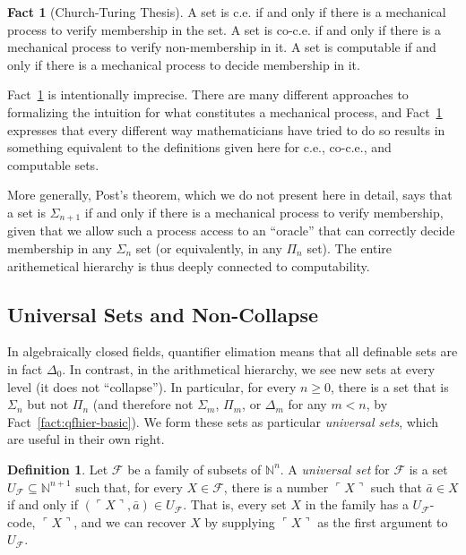 \documentclass{article}
\theoremstyle{plain}
\theoremstyle{definition}
\newtheorem{defn}[thm]{Definition}
\newtheorem{fact}[thm]{Fact}
\newcommand{\defterm}{\emph}
\newcommand{\tuple}{\bar}
\newcommand{\lgnum}{\ulcorner}
\newcommand{\rgnum}{\urcorner}
\begin{document}
\begin{fact}[Church-Turing Thesis]\label{fact:ct-thesis}
  A set is c.e. if and only if there is a mechanical process to verify
  membership in the set. A set is co-c.e. if and only if there is a
  mechanical process to verify non-membership in it. A set is
  computable if and only if there is a mechanical process to decide
  membership in it.
\end{fact}

Fact~\ref{fact:ct-thesis} is intentionally imprecise. There are many
different approaches to formalizing the intuition for what constitutes
a mechanical process, and Fact~\ref{fact:ct-thesis} expresses that
every different way mathematicians have tried to do so results in
something equivalent to the definitions given here for c.e., co-c.e.,
and computable sets.

More generally, Post's theorem, which we do not present here in
detail, says that a set is $\Sigma_{n+1}$ if and only if there is a
mechanical process to verify membership, given that we allow such a
process access to an ``oracle'' that can correctly decide membership
in any $\Sigma_n$ set (or equivalently, in any $\Pi_n$ set). The
entire arithemetical hierarchy is thus deeply connected to
computability.

\subsection{Universal Sets and Non-Collapse}

In algebraically closed fields, quantifier elimation means that all
definable sets are in fact $\Delta_0$. In contrast, in the
arithmetical hierarchy, we see new sets at every level (it does not
``collapse''). In particular, for every $n \geq 0$, there is a set
that is $\Sigma_n$ but not $\Pi_n$ (and therefore not $\Sigma_m$,
$\Pi_m$, or $\Delta_m$ for any $m < n$, by
Fact~\ref{fact:qfhier-basic}). We form these sets as particular
\defterm{universal sets}, which are useful in their own right.

\begin{defn}
  Let $\mathcal{F}$ be a family of subsets of $\mathbb{N}^n$. A
  \defterm{universal set} for $\mathcal{F}$ is a set $U_\mathcal{F}
  \subseteq \mathbb{N}^{n+1}$ such that, for every $X \in
  \mathcal{F}$, there is a number $\lgnum X \rgnum$ such that
  $\tuple{a} \in X$ if and only if $(\lgnum X \rgnum, \tuple{a}) \in
  U_\mathcal{F}$. That is, every set $X$ in the family has a
  $U_\mathcal{F}$-code, $\lgnum X \rgnum$, and we can recover $X$ by
  supplying $\lgnum X \rgnum$ as the first argument to
  $U_\mathcal{F}$.
\end{defn}
\end{document}

